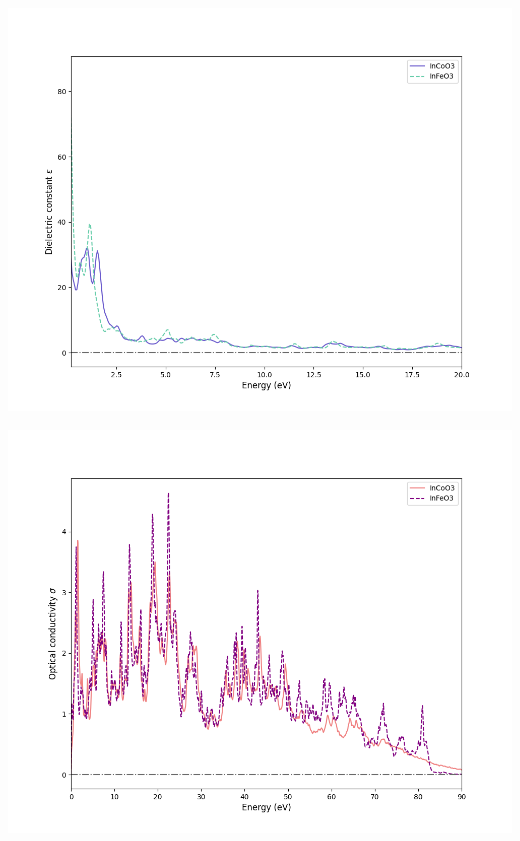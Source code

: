 \documentclass[12pt, letterpaper]{article}
\newcommand*{\1}{\hspace{1pt}}
\begin{document}
    \begin{adjustbox}{center, caption={Dielectric constants of InCoO3 and InFeO3(Imaginary)},label={somelabel},nofloat=figure,}
        \includegraphics[width=\textwidth]{dielecimageng}
    \end{adjustbox}

    \begin{adjustbox}{center,caption={Optical Conductivity of InCoO3 and InFeO3(Real)},label={somelabel},nofloat=figure,vspace=\bigskipamount}
        \includegraphics[width=\textwidth]{opcondrealev}
    \end{adjustbox}
\end{document}
